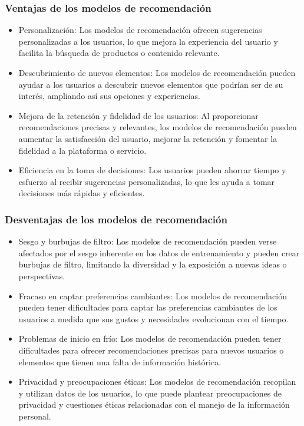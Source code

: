 \subsubsection{Ventajas de los modelos de recomendación}

\begin{itemize}
    \item Personalización: Los modelos de recomendación ofrecen sugerencias personalizadas a los usuarios, lo que mejora la experiencia del usuario y facilita la búsqueda de productos o contenido relevante.
    \item Descubrimiento de nuevos elementos: Los modelos de recomendación pueden ayudar a los usuarios a descubrir nuevos elementos que podrían ser de su interés, ampliando así sus opciones y experiencias.
    \item Mejora de la retención y fidelidad de los usuarios: Al proporcionar recomendaciones precisas y relevantes, los modelos de recomendación pueden aumentar la satisfacción del usuario, mejorar la retención y fomentar la fidelidad a la plataforma o servicio.
    \item Eficiencia en la toma de decisiones: Los usuarios pueden ahorrar tiempo y esfuerzo al recibir sugerencias personalizadas, lo que les ayuda a tomar decisiones más rápidas y eficientes.
\end{itemize}

\subsubsection{Desventajas de los modelos de recomendación}

\begin{itemize}
    \item Sesgo y burbujas de filtro: Los modelos de recomendación pueden verse afectados por el sesgo inherente en los datos de entrenamiento y pueden crear burbujas de filtro, limitando la diversidad y la exposición a nuevas ideas o perspectivas.
    \item Fracaso en captar preferencias cambiantes: Los modelos de recomendación pueden tener dificultades para captar las preferencias cambiantes de los usuarios a medida que sus gustos y necesidades evolucionan con el tiempo.
    \item Problemas de inicio en frío: Los modelos de recomendación pueden tener dificultades para ofrecer recomendaciones precisas para nuevos usuarios o elementos que tienen una falta de información histórica.
    \item Privacidad y preocupaciones éticas: Los modelos de recomendación recopilan y utilizan datos de los usuarios, lo que puede plantear preocupaciones de privacidad y cuestiones éticas relacionadas con el manejo de la información personal.
\end{itemize}
